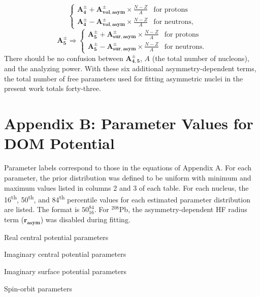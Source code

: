 \documentclass[twocolumn,secnumarabic,amssymb, nobibnotes, aps, prl,
superscriptaddress, nobalancelastpage, floatfix]{revtex4}
\newcommand{\pbEight}{\ensuremath{^{208}}P\lowercase{b}}
\begin{document}
{\begin{equation}
\begin{cases}
        \mathbf{A_{4}^{\pm}} + \mathbf{A_{vol, asym}^{\pm}}\times\frac{N-Z}{A} & \text{for protons}\\
        \mathbf{A_{4}^{\pm}} - \mathbf{A_{vol, asym}^{\pm}}\times\frac{N-Z}{A} & \text{for neutrons},
    \end{cases}
\end{equation}
\begin{equation} \label{ImSurAsymmDependence}
    \mathbf{A_{5}^{\pm}} \Rightarrow \begin{cases}
        \mathbf{A_{5}^{\pm}} + \mathbf{A_{sur, asym}^{\pm}}\times\frac{N-Z}{A} & \text{for protons}\\
        \mathbf{A_{5}^{\pm}} - \mathbf{A_{sur, asym}^{\pm}}\times\frac{N-Z}{A} & \text{for neutrons}.
    \end{cases}
\end{equation}
There should be no confusion between $\mathbf{A_{4,5}^{\pm}}$, $A$ (the total number
of nucleons), and the analyzing power. 
With these six additional asymmetry-dependent terms,
the total number of free parameters used for
fitting asymmetric nuclei in the present work totals forty-three.

\clearpage
\onecolumngrid
\appendix \label{DOMParameterValues}
\section{Appendix B: Parameter Values for DOM Potential}
Parameter labels correspond to those in the equations of Appendix A. 
For each parameter, the prior distribution was defined to be uniform with minimum and maximum values
listed in columns 2 and 3 of each table. For each nucleus, the
16\textsuperscript{th}, 50\textsuperscript{th}, and
84\textsuperscript{th} percentile values for each estimated parameter
distribution are listed. The format is $\text{50}^{\text{84}}_{\text{16}}$.
For \pbEight, the asymmetry-dependent HF radius term ($\mathbf{r_{asym}}$) was disabled during fitting.
\begin{table}[htbp]
    \caption{Real central potential parameters}
    
    \caption{Imaginary central potential parameters}
    
\end{table}
\clearpage
\begin{table}[htbp!]
    \caption{Imaginary surface potential parameters}
    
    \vspace{0.3em}
    \caption{Spin-orbit parameters}
    
\end{table}
\appendix \label{DOMFitResults}
}
\end{document}
